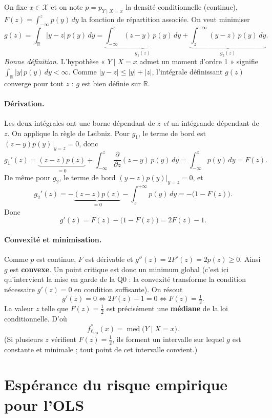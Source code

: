 \documentclass[11pt,a4paper]{article}
\newcommand{\R}{\mathbb{R}}
\newcommand{\X}{\mathcal{X}}
\newcommand{\fstar}{f^{*}}
\DeclareMathOperator{\med}{med}
\theoremstyle{plain}
\begin{document}
On fixe $x\in\X$ et on note $p=p_{Y\mid X=x}$ la densité conditionnelle (continue),
$F(z)=\int_{-\infty}^{z}p(y)\,dy$ la fonction de répartition associée. On veut
minimiser
\[
    g(z)=\int_{\R}\lvert y-z\rvert\,p(y)\,dy
        =\underbrace{\int_{-\infty}^{z}(z-y)\,p(y)\,dy}_{g_1(z)}
        +\underbrace{\int_{z}^{+\infty}(y-z)\,p(y)\,dy}_{g_2(z)} .
\]
\emph{Bonne définition.} L'hypothèse « $Y\mid X=x$ admet un moment d'ordre 1 »
signifie $\int_{\R}\lvert y\rvert\,p(y)\,dy<\infty$. Comme
$\lvert y-z\rvert\le \lvert y\rvert+\lvert z\rvert$, l'intégrale définissant
$g(z)$ converge pour tout $z$ : $g$ est bien définie sur $\R$.

\paragraph{Dérivation.} Les deux intégrales ont une borne dépendant de $z$
\emph{et} un intégrande dépendant de $z$. On applique la règle de Leibniz. Pour
$g_1$, le terme de bord est $(z-y)p(y)\big|_{y=z}=0$, donc
\[
    g_1'(z)=\underbrace{(z-z)p(z)}_{=0}+\int_{-\infty}^{z}\frac{\partial}{\partial z}(z-y)\,p(y)\,dy
           =\int_{-\infty}^{z}p(y)\,dy=F(z).
\]
De même pour $g_2$, le terme de bord $(y-z)p(y)\big|_{y=z}=0$, et
\[
    g_2'(z)=-\underbrace{(z-z)p(z)}_{=0}-\int_{z}^{+\infty}p(y)\,dy
           =-\big(1-F(z)\big).
\]
Donc
\[
    g'(z)=F(z)-\big(1-F(z)\big)=2F(z)-1 .
\]

\paragraph{Convexité et minimisation.} Comme $p$ est continue, $F$ est dérivable
et $g''(z)=2F'(z)=2p(z)\ge 0$. Ainsi $g$ est \textbf{convexe}. Un point critique
est donc un minimum global (c'est ici qu'intervient la mise en garde de la Q0 :
la convexité transforme la condition nécessaire $g'(z)=0$ en condition
suffisante). On résout
\[
    g'(z)=0\iff 2F(z)-1=0\iff F(z)=\tfrac12 .
\]
La valeur $z$ telle que $F(z)=\frac12$ est précisément une \textbf{médiane} de la
loi conditionnelle. D'où
\[
    \boxed{\,\fstar_{\ell_\text{abs}}(x)=\med\big(Y\mid X=x\big).\,}
\]
(Si plusieurs $z$ vérifient $F(z)=\frac12$, ils forment un intervalle sur lequel
$g$ est constante et minimale ; tout point de cet intervalle convient.)

\section{Espérance du risque empirique pour l'OLS}
\end{document}
